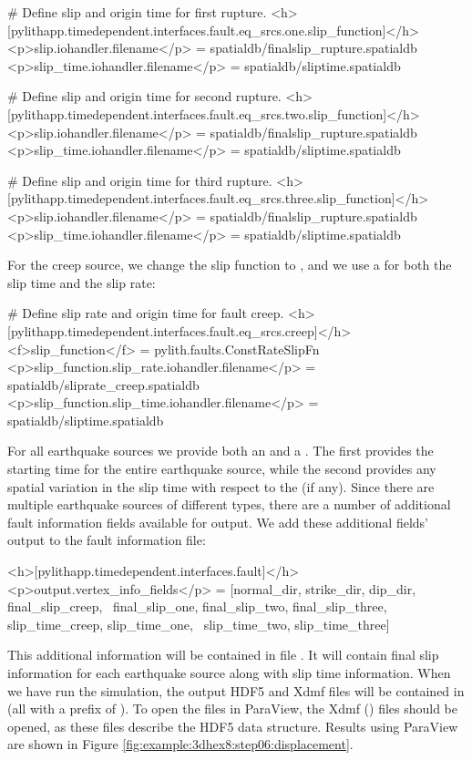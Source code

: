 \begin{cfg}
# Define slip and origin time for first rupture.
<h>[pylithapp.timedependent.interfaces.fault.eq_srcs.one.slip_function]</h>
<p>slip.iohandler.filename</p> = spatialdb/finalslip_rupture.spatialdb
<p>slip_time.iohandler.filename</p> = spatialdb/sliptime.spatialdb

# Define slip and origin time for second rupture.
<h>[pylithapp.timedependent.interfaces.fault.eq_srcs.two.slip_function]</h>
<p>slip.iohandler.filename</p> = spatialdb/finalslip_rupture.spatialdb
<p>slip_time.iohandler.filename</p> = spatialdb/sliptime.spatialdb

# Define slip and origin time for third rupture.
<h>[pylithapp.timedependent.interfaces.fault.eq_srcs.three.slip_function]</h>
<p>slip.iohandler.filename</p> = spatialdb/finalslip_rupture.spatialdb
<p>slip_time.iohandler.filename</p> = spatialdb/sliptime.spatialdb
\end{cfg}
For the creep source, we change the slip function to ,
and we use a  for both the slip time and the slip
rate:
\begin{cfg}
# Define slip rate and origin time for fault creep.
<h>[pylithapp.timedependent.interfaces.fault.eq_srcs.creep]</h>
<f>slip_function</f> = pylith.faults.ConstRateSlipFn
<p>slip_function.slip_rate.iohandler.filename</p> = spatialdb/sliprate_creep.spatialdb
<p>slip_function.slip_time.iohandler.filename</p> = spatialdb/sliptime.spatialdb
\end{cfg}
For all earthquake sources we provide both an 
and a . The first provides the starting
time for the entire earthquake source, while the second provides any
spatial variation in the slip time with respect to the 
(if any). Since there are multiple earthquake sources of different
types, there are a number of additional fault information fields available
for output. We add these additional fields' output to the fault information
file:
\begin{cfg}
<h>[pylithapp.timedependent.interfaces.fault]</h>
<p>output.vertex_info_fields</p> = [normal_dir, strike_dir, dip_dir, final_slip_creep, \
  final_slip_one, final_slip_two, final_slip_three, slip_time_creep, slip_time_one, \
  slip_time_two, slip_time_three]
\end{cfg}
This additional information will be contained in file .
It will contain final slip information for each earthquake source
along with slip time information. When we have run the simulation,
the output HDF5 and Xdmf files will be contained in 
(all with a prefix of \filename{step06}). To open the files in ParaView,
the Xdmf (\filename{.xmf}) files should be opened, as these files describe
the HDF5 data structure. Results using ParaView are shown in Figure
\vref{fig:example:3dhex8:step06:displacement}.


